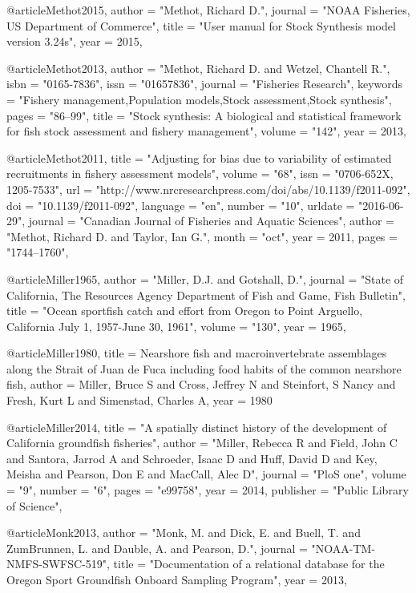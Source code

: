 @article{Methot2015,
    author = "{Methot, Richard D.}",
    journal = "{NOAA Fisheries, US Department of Commerce}",
    title = "{{User manual for Stock Synthesis model version 3.24s}}",
    year = 2015,
}

@article{Methot2013,
    author = "{Methot, Richard D. and Wetzel, Chantell R.}",
    isbn = "{0165-7836}",
    issn = "{01657836}",
    journal = "{Fisheries Research}",
    keywords = "{Fishery management,Population models,Stock assessment,Stock synthesis}",
    pages = "{86--99}",
    title = "{{Stock synthesis: A biological and statistical framework for fish stock assessment and fishery management}}",
    volume = "{142}",
    year = 2013,
}

@article{Methot2011,
    title = "{Adjusting for bias due to variability of estimated recruitments in fishery assessment models}",
    volume = "{68}",
    issn = "{0706-652X, 1205-7533}",
    url = "{http://www.nrcresearchpress.com/doi/abs/10.1139/f2011-092}",
    doi = "{10.1139/f2011-092}",
    language = "{en}",
    number = "{10}",
    urldate = "{2016-06-29}",
    journal = "{Canadian Journal of Fisheries and Aquatic Sciences}",
    author = "{Methot, Richard D. and Taylor, Ian G.}",
    month = "oct",
    year = 2011,
    pages = "{1744--1760}",
}

@article{Miller1965,
    author = "{Miller, D.J. and Gotshall, D.}",
    journal = "{State of California, The Resources Agency Department of Fish and Game, Fish Bulletin}",
    title = "{{Ocean sportfish catch and effort from Oregon to Point Arguello, California July 1, 1957-June 30, 1961}}",
    volume = "{130}",
    year = 1965,
}

@article{Miller1980,
  title = {Nearshore fish and macroinvertebrate assemblages along the Strait of Juan de Fuca including food habits of the common nearshore fish},
  author = {Miller, Bruce S and Cross, Jeffrey N and Steinfort, S Nancy and Fresh, Kurt L and Simenstad, Charles A},
  year = 1980
}

@article{Miller2014,
    title = "{A spatially distinct history of the development of California groundfish fisheries}",
    author = "{Miller, Rebecca R and Field, John C and Santora, Jarrod A and Schroeder, Isaac D and Huff, David D and Key, Meisha and Pearson, Don E and MacCall, Alec D}",
    journal = "{PloS one}",
    volume = "{9}",
    number = "{6}",
    pages = "{e99758}",
    year = 2014,
    publisher = "{Public Library of Science}",
}

@article{Monk2013,
    author = "{Monk, M. and Dick, E. and Buell, T. and ZumBrunnen, L. and Dauble, A. and Pearson, D.}",
    journal = "{NOAA-TM-NMFS-SWFSC-519}",
    title = "{{Documentation of a relational database for the Oregon Sport Groundfish Onboard Sampling Program}}",
    year = 2013,
}

